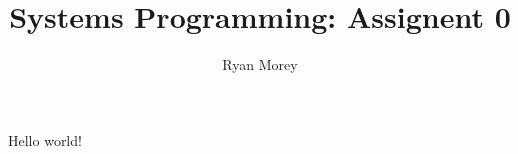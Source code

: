 \documentclass{article}
\title{Systems Programming: Assignent 0}
\author{Ryan Morey}
\begin{document}
Hello world!
\end{document}

